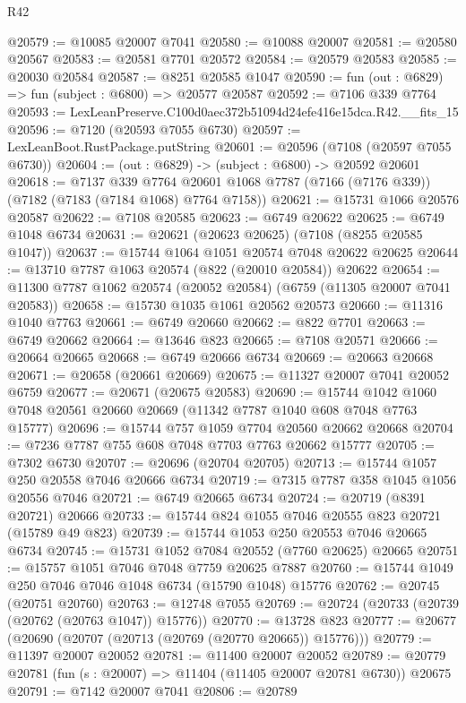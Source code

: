 \begin{lexlean}{R42}
\begin{coremodule}
{@20579 := @10085 @20007 @7041
@20580 := @10088 @20007
@20581 := @20580 @20567
@20583 := @20581 @7701 @20572
@20584 := @20579 @20583
@20585 := @20030 @20584
@20587 := @8251 @20585 @1047
@20590 := fun (out : @6829) => fun (subject : @6800) => @20577 @20587
@20592 := @7106 @339 @7764
@20593 := LexLeanPreserve.C100d0aec372b51094d24efe416e15dca.R42.__fits_15
@20596 := @7120 (@20593 @7055 @6730)
@20597 := LexLeanBoot.RustPackage.putString
@20601 := @20596 (@7108 (@20597 @7055 @6730))
@20604 := (out : @6829) -> (subject : @6800) -> @20592 @20601
@20618 := @7137
    @339
    @7764
    @20601
    @1068
    @7787
    (@7166 (@7176 @339))
    (@7182 (@7183 (@7184 @1068) @7764 @7158))
@20621 := @15731 @1066 @20576 @20587
@20622 := @7108 @20585
@20623 := @6749 @20622
@20625 := @6749 @1048 @6734
@20631 := @20621 (@20623 @20625) (@7108 (@8255 @20585 @1047))
@20637 := @15744 @1064 @1051 @20574 @7048 @20622 @20625
@20644 := @13710 @7787 @1063 @20574 (@822 (@20010 @20584)) @20622
@20654 := @11300 @7787 @1062 @20574 (@20052 @20584) (@6759 (@11305 @20007 @7041 @20583))
@20658 := @15730 @1035 @1061 @20562 @20573
@20660 := @11316 @1040 @7763
@20661 := @6749 @20660
@20662 := @822 @7701
@20663 := @6749 @20662
@20664 := @13646 @823
@20665 := @7108 @20571
@20666 := @20664 @20665
@20668 := @6749 @20666 @6734
@20669 := @20663 @20668
@20671 := @20658 (@20661 @20669)
@20675 := @11327 @20007 @7041 @20052 @6759
@20677 := @20671 (@20675 @20583)
@20690 := @15744 @1042 @1060 @7048 @20561 @20660 @20669 (@11342 @7787 @1040 @608 @7048 @7763 @15777)
@20696 := @15744 @757 @1059 @7704 @20560 @20662 @20668
@20704 := @7236 @7787 @755 @608 @7048 @7703 @7763 @20662 @15777
@20705 := @7302 @6730
@20707 := @20696 (@20704 @20705)
@20713 := @15744 @1057 @250 @20558 @7046 @20666 @6734
@20719 := @7315 @7787 @358 @1045 @1056 @20556 @7046
@20721 := @6749 @20665 @6734
@20724 := @20719 (@8391 @20721) @20666
@20733 := @15744 @824 @1055 @7046 @20555 @823 @20721 (@15789 @49 @823)
@20739 := @15744 @1053 @250 @20553 @7046 @20665 @6734
@20745 := @15731 @1052 @7084 @20552 (@7760 @20625) @20665
@20751 := @15757 @1051 @7046 @7048 @7759 @20625 @7887
@20760 := @15744 @1049 @250 @7046 @7046 @1048 @6734 (@15790 @1048) @15776
@20762 := @20745 (@20751 @20760)
@20763 := @12748 @7055
@20769 := @20724 (@20733 (@20739 (@20762 (@20763 @1047)) @15776))
@20770 := @13728 @823
@20777 := @20677 (@20690 (@20707 (@20713 (@20769 (@20770 @20665)) @15776)))
@20779 := @11397 @20007 @20052
@20781 := @11400 @20007 @20052
@20789 := @20779 @20781 (fun (s : @20007) => @11404 (@11405 @20007 @20781 @6730)) @20675
@20791 := @7142 @20007 @7041
@20806 := @20789
}
\end{coremodule}
\end{lexlean}
